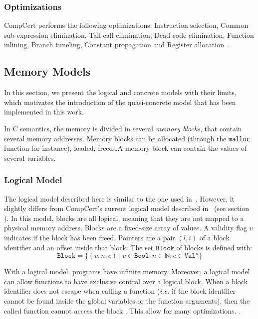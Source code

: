 \subsubsection{Optimizations}
CompCert performs the following optimizations:
Instruction selection, Common sub-expression elimination, Tail call elimination, Dead code elimination, Function inlining, Branch tuneling, Constant propagation and Register allocation~\cite{compcertoverview}.
 

\subsection{Memory Models}
In this section, we present the logical and concrete models with their limits, which motivates the introduction of the quasi-concrete model that has been implemented in this work.

In C semantics, the memory is divided in several \textit{memory blocks}, that contain several memory addresses. Memory blocks can be allocated (through the \texttt{malloc} function for instance), loaded, freed\dots A memory block can contain the values of several variables. 
\subsubsection{Logical Model}
The logical model described here is similar to the one used in~\cite{DBLP:conf/pldi/KangHMGZV15}. However, it slightly differs from CompCert's current logical model described in~\cite{leroy:hal-00703441} (see section ).
In this model, blocks are all logical, meaning that they are not mapped to a physical memory address.
Blocks are a fixed-size array of values.
A validity flag $v$ indicates if the block has been freed.
Pointers are a pair $(l,i)$ of a block identifier and an offset inside that block.
The set $\texttt{Block}$ of blocks is defined with:
$$\texttt{Block}=\{(v,n,c)~|~v\in\texttt{Bool},n\in\mathbb{N},c\in\texttt{Val}^{n}\}$$

With a logical model, programs have infinite memory.
Moreover, a logical model can allow functions to have exclusive control over a logical block.
When a block identifier does not escape when calling a function (\textit{i.e.} if the block identifier cannot be found inside the global variables or the function arguments), then the called function cannot access the block .%
This allow for many optimizations. .

